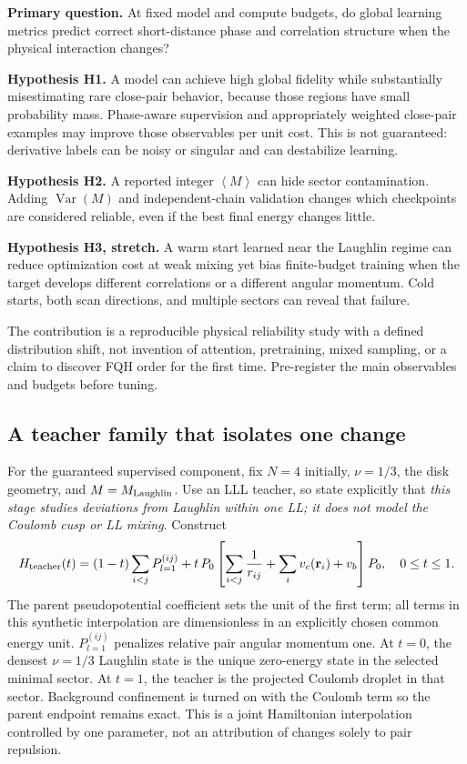 \documentclass[11pt,letterpaper]{article}
\newcommand{\rr}{\mathbf r}
\newcommand{\avg}[1]{\left\langle #1\right\rangle}
\begin{document}
\textbf{Primary question.} At fixed model and compute budgets, do global learning metrics predict correct short-distance phase and correlation structure when the physical interaction changes?

\textbf{Hypothesis H1.} A model can achieve high global fidelity while substantially misestimating rare close-pair behavior, because those regions have small probability mass. Phase-aware supervision and appropriately weighted close-pair examples may improve those observables per unit cost. This is not guaranteed: derivative labels can be noisy or singular and can destabilize learning.

\textbf{Hypothesis H2.} A reported integer $\avg M$ can hide sector contamination. Adding $\operatorname{Var}(M)$ and independent-chain validation changes which checkpoints are considered reliable, even if the best final energy changes little.

\textbf{Hypothesis H3, stretch.} A warm start learned near the Laughlin regime can reduce optimization cost at weak mixing yet bias finite-budget training when the target develops different correlations or a different angular momentum. Cold starts, both scan directions, and multiple sectors can reveal that failure.

The contribution is a reproducible physical reliability study with a defined distribution shift, not invention of attention, pretraining, mixed sampling, or a claim to discover FQH order for the first time. Pre-register the main observables and budgets before tuning.

\subsection{A teacher family that isolates one change}

For the guaranteed supervised component, fix $N=4$ initially, $\nu=1/3$, the disk geometry, and $M=M_{\rm Laughlin}$. Use an LLL teacher, so state explicitly that \emph{this stage studies deviations from Laughlin within one LL; it does not model the Coulomb cusp or LL mixing}. Construct
\begin{equation}
 H_{\rm teacher}(t)=(1-t)\sum_{i<j}P^{(ij)}_{l=1}
 +t\,P_0\left[\sum_{i<j}\frac1{r_{ij}}+\sum_i v_c(\rr_i)+v_b\right]P_0,
 \quad 0\le t\le1.
 \label{eq:teacher}
\end{equation}
The parent pseudopotential coefficient sets the unit of the first term; all terms in this synthetic interpolation are dimensionless in an explicitly chosen common energy unit. $P_{l=1}^{(ij)}$ penalizes relative pair angular momentum one. At $t=0$, the densest $\nu=1/3$ Laughlin state is the unique zero-energy state in the selected minimal sector. At $t=1$, the teacher is the projected Coulomb droplet in that sector. Background confinement is turned on with the Coulomb term so the parent endpoint remains exact. This is a joint Hamiltonian interpolation controlled by one parameter, not an attribution of changes solely to pair repulsion.
\end{document}
